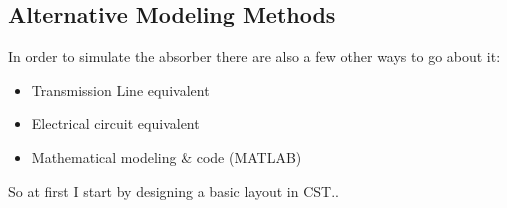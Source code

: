     \subsection{\textsf{Alternative Modeling Methods}}
        In order to simulate the absorber there are also a few other ways to go about it:
        \begin{itemize}
            \item Transmission Line equivalent
            \item Electrical circuit equivalent
            \item Mathematical modeling \& code (MATLAB)
        \end{itemize}

        So at first I start by designing a basic layout in CST..